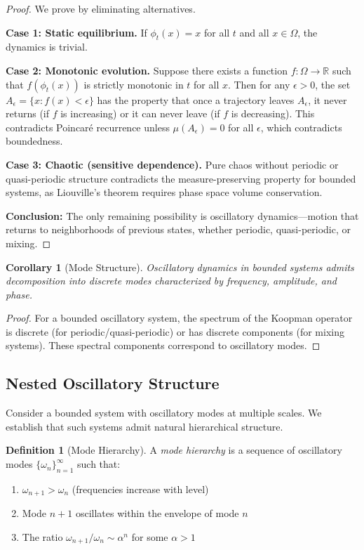 \documentclass[twocolumn,10pt,a4paper]{article}
\newtheorem{corollary}[theorem]{Corollary}
\theoremstyle{definition}
\newtheorem{definition}[theorem]{Definition}
\theoremstyle{remark}
\newcommand{\Real}{\mathbb{R}}
\begin{document}
\begin{proof}
We prove by eliminating alternatives.

\textbf{Case 1: Static equilibrium.} If $\phi_t(x) = x$ for all $t$ and all $x \in \Omega$, the dynamics is trivial.

\textbf{Case 2: Monotonic evolution.} Suppose there exists a function $f: \Omega \to \Real$ such that $f(\phi_t(x))$ is strictly monotonic in $t$ for all $x$. Then for any $\epsilon > 0$, the set $A_\epsilon = \{x : f(x) < \epsilon\}$ has the property that once a trajectory leaves $A_\epsilon$, it never returns (if $f$ is increasing) or it can never leave (if $f$ is decreasing). This contradicts Poincar\'{e} recurrence unless $\mu(A_\epsilon) = 0$ for all $\epsilon$, which contradicts boundedness.

\textbf{Case 3: Chaotic (sensitive dependence).} Pure chaos without periodic or quasi-periodic structure contradicts the measure-preserving property for bounded systems, as Liouville's theorem requires phase space volume conservation.

\textbf{Conclusion:} The only remaining possibility is oscillatory dynamics---motion that returns to neighborhoods of previous states, whether periodic, quasi-periodic, or mixing.
\end{proof}

\begin{corollary}[Mode Structure]
\label{cor:modes}
Oscillatory dynamics in bounded systems admits decomposition into discrete modes characterized by frequency, amplitude, and phase.
\end{corollary}

\begin{proof}
For a bounded oscillatory system, the spectrum of the Koopman operator \cite{koopman1931} is discrete (for periodic/quasi-periodic) or has discrete components (for mixing systems). These spectral components correspond to oscillatory modes.
\end{proof}

\subsection{Nested Oscillatory Structure}

Consider a bounded system with oscillatory modes at multiple scales. We establish that such systems admit natural hierarchical structure.

\begin{definition}[Mode Hierarchy]
\label{def:hierarchy}
A \emph{mode hierarchy} is a sequence of oscillatory modes $\{\omega_n\}_{n=1}^{\infty}$ such that:
\begin{enumerate}
    \item $\omega_{n+1} > \omega_n$ (frequencies increase with level)
    \item Mode $n+1$ oscillates within the envelope of mode $n$
    \item The ratio $\omega_{n+1}/\omega_n \sim \alpha^n$ for some $\alpha > 1$
\end{enumerate}
\end{definition}
\end{document}
